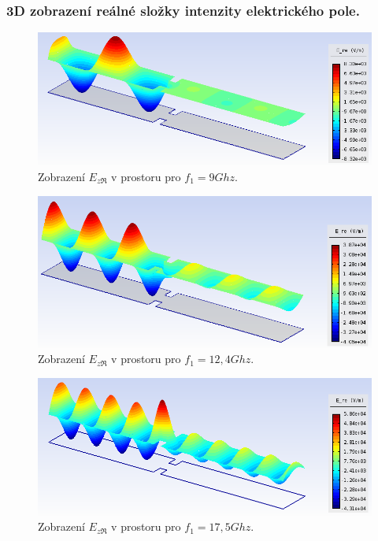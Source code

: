 \subsubsection*{3D zobrazení reálné složky intenzity elektrického pole.}
\begin{figure}[!h]
	\centering
	\includegraphics[width=14cm]{priklad_R100narrow_Ere_9Ghz_3D.png}
	\caption{Zobrazení $E_{z\Re}$ v prostoru pro $f_1 = 9\unit{Ghz}$.}
	\label{obr:priklad_R100narrow_Ere_9Ghz_3D}
\end{figure}
\begin{figure}[!h]
	\centering
	\includegraphics[width=14cm]{priklad_R100narrow_Ere_12Ghz_3D.png}
	\caption{Zobrazení $E_{z\Re}$ v prostoru pro $f_1 = 12,4\unit{Ghz}$.}
	\label{obr:priklad_R100narrow_Ere_12Ghz_3D}
\end{figure}
\begin{figure}[!h]
	\centering
	\includegraphics[width=14cm]{priklad_R100narrow_Ere_17Ghz_3D.png}
	\caption{Zobrazení $E_{z\Re}$ v prostoru pro $f_1 = 17,5\unit{Ghz}$.}
	\label{obr:priklad_R100narrow_Ere_17Ghz_3D}
\end{figure}